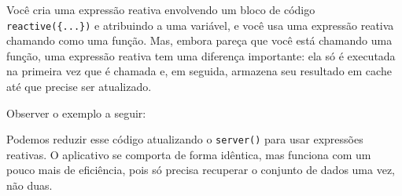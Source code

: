\documentclass[
]{book}
\newenvironment{Shaded}{\begin{snugshade}}{\end{snugshade}}
\newcommand{\AttributeTok}[1]{\textcolor[rgb]{0.77,0.63,0.00}{#1}}
\newcommand{\ControlFlowTok}[1]{\textcolor[rgb]{0.13,0.29,0.53}{\textbf{#1}}}
\newcommand{\FunctionTok}[1]{\textcolor[rgb]{0.00,0.00,0.00}{#1}}
\newcommand{\NormalTok}[1]{#1}
\newcommand{\OtherTok}[1]{\textcolor[rgb]{0.56,0.35,0.01}{#1}}
\newcommand{\SpecialCharTok}[1]{\textcolor[rgb]{0.00,0.00,0.00}{#1}}
\newcommand{\StringTok}[1]{\textcolor[rgb]{0.31,0.60,0.02}{#1}}
\begin{document}
Você cria uma expressão reativa envolvendo um bloco de código \texttt{reactive(\{...\})} e atribuindo a uma variável, e você usa uma expressão reativa chamando como uma função. Mas, embora pareça que você está chamando uma função, uma expressão reativa tem uma diferença importante: ela só é executada na primeira vez que é chamada e, em seguida, armazena seu resultado em cache até que precise ser atualizado.

Observer o exemplo a seguir:

\begin{Shaded}
\end{Shaded}

Podemos reduzir esse código atualizando o \texttt{server()} para usar expressões reativas. O aplicativo se comporta de forma idêntica, mas funciona com um pouco mais de eficiência, pois só precisa recuperar o conjunto de dados uma vez, não duas.
\end{document}
